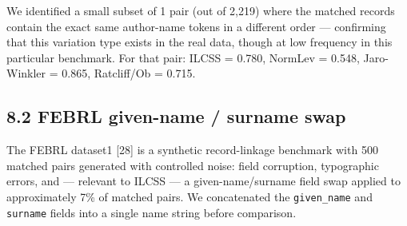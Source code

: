 \documentclass[
  11pt,
]{article}
\begin{document}
We identified a small subset of 1 pair (out of 2,219) where the matched
records contain the exact same author-name tokens in a different order
--- confirming that this variation type exists in the real data, though
at low frequency in this particular benchmark. For that pair: ILCSS =
0.780, NormLev = 0.548, Jaro-Winkler = 0.865, Ratcliff/Ob = 0.715.

\subsection{8.2 FEBRL given-name / surname
swap}\label{febrl-given-name-surname-swap}

The FEBRL dataset1 {[}28{]} is a synthetic record-linkage benchmark with
500 matched pairs generated with controlled noise: field corruption,
typographic errors, and --- relevant to ILCSS --- a given-name/surname
field swap applied to approximately 7\% of matched pairs. We
concatenated the \texttt{given\_name} and \texttt{surname} fields into a
single name string before comparison.
\end{document}
